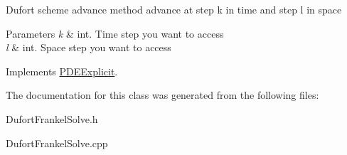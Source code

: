 Dufort scheme advance method advance at step k in time and step l in space 
\begin{DoxyParams}{Parameters}
{\em k} & int. Time step you want to access \\
\hline
{\em l} & int. Space step you want to access \\
\hline
\end{DoxyParams}


Implements \hyperlink{class_p_d_e_explicit_aed238f52510878474c02681904013dd3}{P\+D\+E\+Explicit}.



The documentation for this class was generated from the following files\+:\begin{DoxyCompactItemize}
\item 
Dufort\+Frankel\+Solve.\+h\item 
Dufort\+Frankel\+Solve.\+cpp\end{DoxyCompactItemize}
